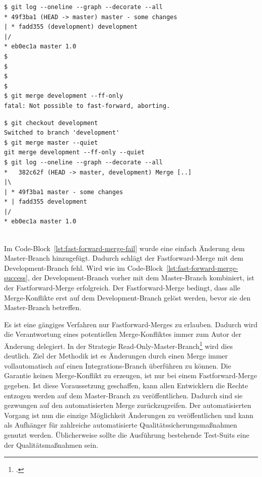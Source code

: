 \begin{minipage}{.45\textwidth}
\begin{lstlisting}[caption={Der development Branch schlägt fehl beim Fastforward-Merge}, frame=none,label={lst:fast-forward-merge-fail}]
$ git log --oneline --graph --decorate --all
* 49f3ba1 (HEAD -> master) master - some changes
| * fadd355 (development) development
|/
* eb0ec1a master 1.0
$
$
$
$
$ git merge development --ff-only
fatal: Not possible to fast-forward, aborting.
\end{lstlisting}
\end{minipage}\hfill
\begin{minipage}{.45\textwidth}
\begin{lstlisting}[caption={Nach einem Merge ist der Fastforward-Merge möglich},frame=none,label={lst:fast-forward-merge-success}]
$ git checkout development
Switched to branch 'development'
$ git merge master --quiet
git merge development --ff-only --quiet
$ git log --oneline --graph --decorate --all
*   382c62f (HEAD -> master, development) Merge [..]
|\
| * 49f3ba1 master - some changes
* | fadd355 development
|/
* eb0ec1a master 1.0
\end{lstlisting}
\end{minipage}
\\
Im Code-Block~\ref{lst:fast-forward-merge-fail} wurde eine einfach Änderung dem Master-Branch hinzugefügt. Dadurch schlägt der Fastforward-Merge mit dem Development-Branch fehl. Wird wie im Code-Block~\ref{lst:fast-forward-merge-success}, der Development-Branch vorher mit dem Master-Branch kombiniert, ist der Fastforward-Merge erfolgreich. Der Fastforward-Merge bedingt, dass alle Merge-Konflikte erst auf dem Development-Branch gelöst werden, bevor sie den Master-Branch betreffen.

Es ist eine gängiges Verfahren nur Fastforward-Merges zu erlauben. Dadurch wird die Verantwortung eines potentiellen Merge-Konfliktes immer zum Autor der Änderung delegiert.
In der Strategie \glqq Read-Only-Master-Branch\grqq{}\footcite{master-read-only} wird dies deutlich. Ziel der Methodik ist es Änderungen durch einen Merge immer vollautomatisch auf einen Integrations-Branch überführen zu können. Die Garantie keinen Merge-Konflikt zu erzeugen, ist nur bei einem Fastforward-Merge gegeben. Ist diese Voraussetzung geschaffen, kann allen Entwicklern die Rechte entzogen werden auf dem Master-Branch zu veröffentlichen. Dadurch sind sie gezwungen auf den automatisierten Merge zurückzugreifen. Der automatisierten Vorgang ist nun die einzige Möglichkeit Änderungen zu veröffentlichen und kann als Aufhänger für zahlreiche automatisierte Qualitätssicherungsmaßnahmen genutzt werden. Üblicherweise sollte die Ausführung bestehende Test-Suits eine der Qualitätsmaßnahmen sein.

